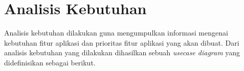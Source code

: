 %
%
%
%

\section {Analisis Kebutuhan}

Analisis kebutuhan dilakukan guna mengumpulkan informasi mengenai kebutuhan fitur aplikasi dan prioritas fitur aplikasi yang akan dibuat. Dari analisis kebutuhan yang dilakukan dihasilkan sebuah \textit{usecase diagram} yang didefinisikan sebagai berikut.

